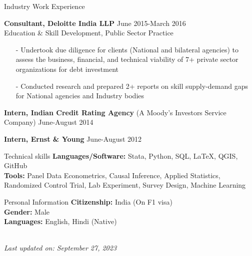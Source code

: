 \documentclass{resume} %
\begin{document}
\vspace{2em}


\begin{rSection}{Industry Work Experience} \itemsep -2pt
	\vspace{.5em}
		\item[]	{\bf Consultant, Deloitte India LLP} \quad  \hfill{June 2015-March 2016} \\
		Education \& Skill Development, Public Sector Practice
	\begin{itemize}
		\item[-] Undertook due diligence for clients (National and bilateral agencies) to assess the business, financial, and technical viability of 7+ private sector organizations for debt investment
		\item[-] Conducted research and prepared 2+ reports on skill supply-demand gaps for National agencies and Industry bodies \\
	\end{itemize}
	\item[]	{\bf Intern, Indian Credit Rating Agency} {(A Moody's Investors Service Company)} \quad  \hfill{June-August 2014}
	
	\item[]	{\bf Intern, Ernst \& Young} \quad  \hfill{June-August 2012}
			
	
\end{rSection}

\vspace{0.5em}
\begin{rSection}{Technical skills}
	\vspace{.5em}
{\bf Languages/Software:} Stata, Python, SQL, LaTeX, QGIS, GitHub \\ 
{\bf Tools:} Panel Data Econometrics, Causal Inference, Applied Statistics, Randomized Control Trial, Lab Experiment, Survey Design, Machine Learning
\end{rSection}





\vspace{0.5em}
\begin{rSection}{Personal Information}
	\vspace{.5em}
	{\bf Citizenship:} India (On F1 visa) \\ 
	{\bf Gender:} Male \\
	{\bf Languages:} English, Hindi (Native) \\~\\
\end{rSection}



\vspace{1em}


\textit{Last updated on: September 27, 2023}
\end{document}
